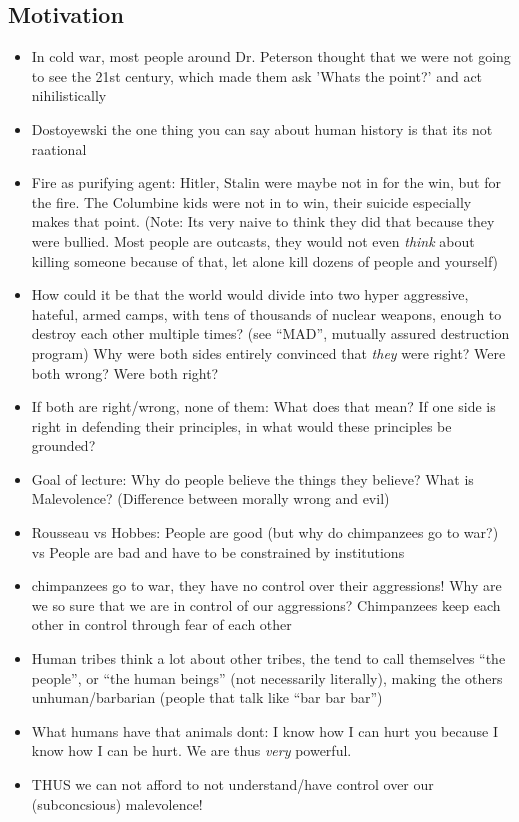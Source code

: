 \documentclass[emulatestandardclasses]{scrartcl}
\begin{document}
\subsection{Motivation}

\begin{itemize}
  \item In cold war, most people around Dr. Peterson thought that we were not going to see the 21st century, which made them ask 'Whats the point?' and act nihilistically
  \item Dostoyewski the one thing you can say about human history is that its not raational
  \item Fire as purifying agent: Hitler, Stalin were maybe not in for the win, but for the fire. The Columbine kids were not in to win, their suicide especially makes that point. (Note: Its very naive to think they did that because they were bullied. Most people are outcasts, they would not even \emph{think} about killing someone because of that, let alone kill dozens of people and yourself)
  \item How could it be that the world would divide into two hyper aggressive, hateful, armed camps, with tens of thousands of nuclear weapons, enough to destroy each other multiple times? (see "`MAD"', mutually assured destruction program) Why were both sides entirely convinced that \emph{they} were right? Were both wrong? Were both right?
  \item If both are right/wrong, none of them: What does that mean? If one side is right in defending their principles, in what would these principles be grounded?
  \item Goal of lecture: Why do people believe the things they believe? What is Malevolence? (Difference between morally wrong and evil) 
  \item Rousseau vs Hobbes: People are good (but why do chimpanzees go to war?) vs People are bad and have to be constrained by institutions
  \item chimpanzees go to war, they have no control over their aggressions! Why are we so sure that we are in control of our aggressions? Chimpanzees keep each other in control through fear of each other
  \item Human tribes think a lot about other tribes, the tend to call themselves "`the people"', or "`the human beings"' (not necessarily literally), making the others unhuman/barbarian (people that talk like "`bar bar bar"')
  \item What humans have that animals dont: I know how I can hurt you because I know how I can be hurt. We are thus \emph{very} powerful.
  \item THUS we can not afford to not understand/have control over our (subconcsious) malevolence!
\end{itemize}
\end{document}
